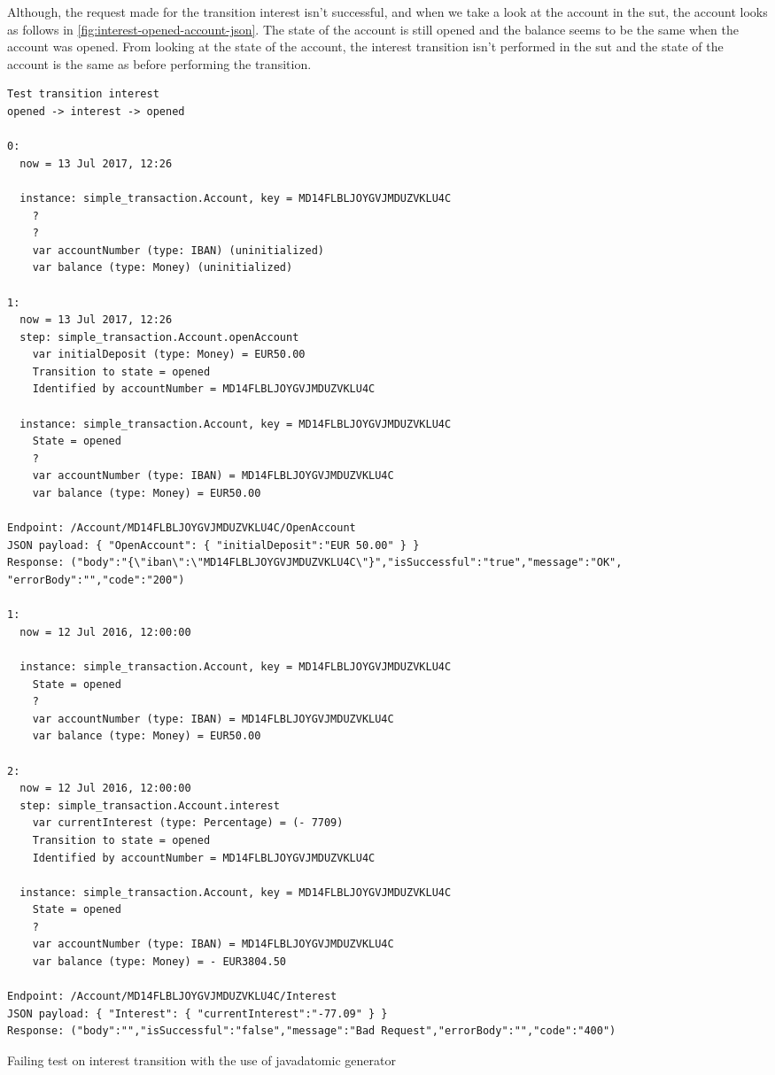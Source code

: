 Although, the request made for the transition interest isn't
successful, and when we take a look at the account in the \gls{sut}, the account looks
as follows in \autoref{fig:interest-opened-account-json}. The state of the
account is still opened and the balance seems to be the same when the account
was opened. From looking at the state of the account, the interest transition
isn't performed in the \gls{sut} and the state of the account is the same as before
performing the transition.


\begin{sourcecode}[h!]
\begin{lstlisting}[]
Test transition interest
opened -> interest -> opened

0:
  now = 13 Jul 2017, 12:26

  instance: simple_transaction.Account, key = MD14FLBLJOYGVJMDUZVKLU4C
    ?
    ?
    var accountNumber (type: IBAN) (uninitialized)
    var balance (type: Money) (uninitialized)

1:
  now = 13 Jul 2017, 12:26
  step: simple_transaction.Account.openAccount
    var initialDeposit (type: Money) = EUR50.00
    Transition to state = opened
    Identified by accountNumber = MD14FLBLJOYGVJMDUZVKLU4C

  instance: simple_transaction.Account, key = MD14FLBLJOYGVJMDUZVKLU4C
    State = opened
    ?
    var accountNumber (type: IBAN) = MD14FLBLJOYGVJMDUZVKLU4C
    var balance (type: Money) = EUR50.00

Endpoint: /Account/MD14FLBLJOYGVJMDUZVKLU4C/OpenAccount
JSON payload: { "OpenAccount": { "initialDeposit":"EUR 50.00" } }
Response: ("body":"{\"iban\":\"MD14FLBLJOYGVJMDUZVKLU4C\"}","isSuccessful":"true","message":"OK",
"errorBody":"","code":"200")

1:
  now = 12 Jul 2016, 12:00:00

  instance: simple_transaction.Account, key = MD14FLBLJOYGVJMDUZVKLU4C
    State = opened
    ?
    var accountNumber (type: IBAN) = MD14FLBLJOYGVJMDUZVKLU4C
    var balance (type: Money) = EUR50.00

2:
  now = 12 Jul 2016, 12:00:00
  step: simple_transaction.Account.interest
    var currentInterest (type: Percentage) = (- 7709)
    Transition to state = opened
    Identified by accountNumber = MD14FLBLJOYGVJMDUZVKLU4C

  instance: simple_transaction.Account, key = MD14FLBLJOYGVJMDUZVKLU4C
    State = opened
    ?
    var accountNumber (type: IBAN) = MD14FLBLJOYGVJMDUZVKLU4C
    var balance (type: Money) = - EUR3804.50

Endpoint: /Account/MD14FLBLJOYGVJMDUZVKLU4C/Interest
JSON payload: { "Interest": { "currentInterest":"-77.09" } }
Response: ("body":"","isSuccessful":"false","message":"Bad Request","errorBody":"","code":"400")
\end{lstlisting}
\caption{Failing test on interest transition with the use of javadatomic generator}\label{fig:result-javadatomic-interest}
\end{sourcecode}
\FloatBarrier

